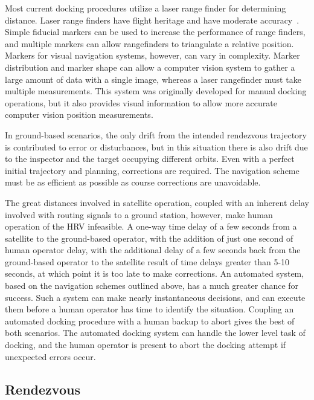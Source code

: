 \documentclass[paper=letter, fontsize=11pt]{scrartcl} %
\numberwithin{equation}{section} %
\numberwithin{figure}{section} %
\numberwithin{table}{section} %
\begin{document}
Most current docking procedures utilize a laser range finder for determining distance. Laser range finders have flight heritage and have moderate accuracy~\cite{Docking}. Simple fiducial markers can be used to increase the performance of range finders, and multiple markers can allow rangefinders to triangulate a relative position. Markers for visual navigation systems, however, can vary in complexity. Marker distribution and marker shape can allow a computer vision system to gather a large amount of data with a single image, whereas a laser rangefinder must take multiple measurements. This system was originally developed for manual docking operations, but it also provides visual information to allow more accurate computer vision position measurements.

In ground-based scenarios, the only drift from the intended rendezvous trajectory is contributed to error or disturbances, but in this situation there is also drift due to the inspector and the target occupying different orbits. Even with a perfect initial trajectory and planning, corrections are required. The navigation scheme must be as efficient as possible as course corrections are unavoidable.

The great distances involved in satellite operation, coupled with an inherent delay involved with routing signals to a ground station, however, make human operation of the HRV infeasible. A one-way time delay of a few seconds from a satellite to the ground-based operator, with the addition of just one second of human operator delay, with the additional delay of a few seconds back from the ground-based operator to the satellite result of time delays greater than 5-10 seconds, at which point it is too late to make corrections. An automated system, based on the navigation schemes outlined above, has a much greater chance for success. Such a system can make nearly instantaneous decisions, and can execute them before a human operator has time to identify the situation. Coupling an automated docking procedure with a human backup to abort gives the best of both scenarios. The automated docking system can handle the lower level task of docking, and the human operator is present to abort the docking attempt if unexpected errors occur.

\subsection{Rendezvous}
\end{document}
